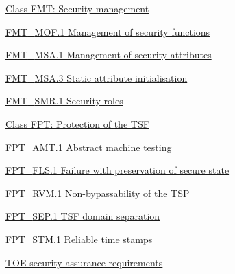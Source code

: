 \documentclass[10pt,a4paper,english]{article}
\begin{document}
\begin{list}{}{}
\begin{list}{}{}
\begin{list}{}{}
\begin{list}{}{}
\begin{list}{}{}
\end{list}

\item {} \href{\#class-fmt-security-management}{Class FMT: Security management}
\begin{list}{}{}
\item {} \href{\#fmt-mof-1-management-of-security-functions}{FMT{\_}MOF.1 Management of security functions}

\item {} \href{\#fmt-msa-1-management-of-security-attributes}{FMT{\_}MSA.1 Management of security attributes}

\item {} \href{\#fmt-msa-3-static-attribute-initialisation}{FMT{\_}MSA.3 Static attribute initialisation}

\item {} \href{\#fmt-smr-1-security-roles}{FMT{\_}SMR.1 Security roles}

\end{list}

\item {} \href{\#class-fpt-protection-of-the-tsf}{Class FPT: Protection of the TSF}
\begin{list}{}{}
\item {} \href{\#fpt-amt-1-abstract-machine-testing}{FPT{\_}AMT.1 Abstract machine testing}

\item {} \href{\#fpt-fls-1-failure-with-preservation-of-secure-state}{FPT{\_}FLS.1 Failure with preservation of secure state}

\item {} \href{\#fpt-rvm-1-non-bypassability-of-the-tsp}{FPT{\_}RVM.1 Non-bypassability of the TSP}

\item {} \href{\#fpt-sep-1-tsf-domain-separation}{FPT{\_}SEP.1 TSF domain separation}

\item {} \href{\#fpt-stm-1-reliable-time-stamps}{FPT{\_}STM.1 Reliable time stamps}

\end{list}

\end{list}

\end{list}

\item {} \href{\#toe-security-assurance-requirements}{TOE security assurance requirements}


\end{list}
\end{list}
\end{document}
